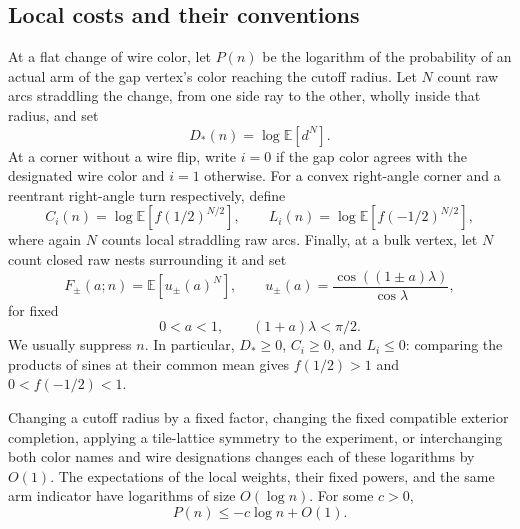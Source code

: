 \subsection{Local costs and their conventions}

At a flat change of wire color, let $P(n)$ be the logarithm of the
probability of an actual arm of the gap vertex's color reaching the
cutoff radius. Let $N$ count raw arcs straddling the change, from one
side ray to the other, wholly inside that radius, and set
\[
 D_*(n)=\log\mathbb E[d^N].
\]
At a corner without a wire flip, write $i=0$ if the gap color agrees
with the designated wire color and $i=1$ otherwise. For a convex
right-angle corner and a reentrant right-angle turn respectively, define
\[
 C_i(n)=\log\mathbb E[f(1/2)^{N/2}],\qquad
 L_i(n)=\log\mathbb E[f(-1/2)^{N/2}],
\]
where again $N$ counts local straddling raw arcs. Finally, at a bulk
vertex, let $N$ count closed raw nests surrounding it and set
\begin{equation}\label{exp:bulk-weights}
 F_\pm(a;n)=\mathbb E[u_\pm(a)^N],\qquad
 u_\pm(a)=\frac{\cos((1\pm a)\lambda)}{\cos\lambda},
\end{equation}
for fixed
\begin{equation}\label{exp:charge-range}
 0<a<1,\qquad (1+a)\lambda<\pi/2.
\end{equation}
We usually suppress $n$. In particular,
$D_*\ge0$, $C_i\ge0$, and $L_i\le0$: comparing the products of
sines at their common mean gives $f(1/2)>1$ and
$0<f(-1/2)<1$.

\begin{lemma}\label{exp:local-costs}
Changing a cutoff radius by a fixed factor, changing the fixed compatible
exterior completion, applying a tile-lattice symmetry to the experiment, or
interchanging both color names and wire designations changes each of
these logarithms by $O(1)$. The expectations of the local weights,
their fixed powers, and the same arm indicator have logarithms of size
$O(\log n)$. For some $c>0$,
\begin{equation}\label{exp:strict-arm}
 P(n)\le-c\log n+O(1).
\end{equation}
\end{lemma}


